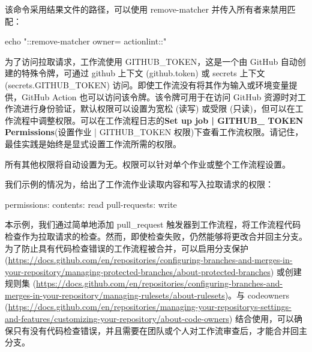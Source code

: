 
该命令采用结果文件的路径，可以使用 remove-matcher 并传入所有者来禁用匹配：

\begin{shell}
  echo "::remove-matcher owner= actionlint::"
\end{shell}

为了访问拉取请求，工作流使用 GITHUB\_TOKEN，这是一个由 GitHub 自动创建的特殊令牌，可通过 github 上下文 (github.token) 或 secrets 上下文 (secrets.GITHUB\_TOKEN) 访问。即使工作流没有将其作为输入或环境变量提供，GitHub Action 也可以访问该令牌。该令牌可用于在访问 GitHub 资源时对工作流进行身份验证，默认权限可以设置为宽松 (读写) 或受限 (只读)，但可以在工作流程中调整权限。可以在工作流程日志的\textbf{Set up job | GITHUB\_
TOKEN Permissions}(设置作业 | GITHUB\_TOKEN 权限)下查看工作流权限。请记住，最佳实践是始终是显式设置工作流所需的权限。

所有其他权限将自动设置为无。权限可以针对单个作业或整个工作流程设置。

我们示例的情况为，给出了工作流作业读取内容和写入拉取请求的权限：

\begin{shell}
permissions:
  contents: read
  pull-requests: write
\end{shell}


本示例，我们通过简单地添加 pull\_request 触发器到工作流程，将工作流程代码检查作为拉取请求的检查。然而，即使检查失败，仍然能够将更改合并回主分支。为了防止具有代码检查错误的工作流程被合并，可以启用分支保护 (\url{https://docs.github.com/en/repositories/configuring-branches-and-merges-in-your-repository/managing-protected-branches/about-protected-branches}) 或创建规则集 (\url{https://docs.github.com/en/repositories/configuring-branches-and-merges-in-your-repository/managing-rulesets/about-rulesets})。与 codeowners (\url{https://docs.github.com/en/repositories/managing-your-repositorys-settings-and-features/customizing-your-repository/about-code-owners}) 结合使用，可以确保只有没有代码检查错误，并且需要在团队或个人对工作流审查后，才能合并回主分支。












